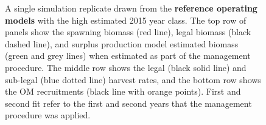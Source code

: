 \documentclass[11pt]{book}
\begin{document}
\newpage
\begin{landscape}
\begin{figure}[htb]

{\centering {} 

}

\caption{A single simulation replicate drawn from the \textbf{reference operating models} with the high estimated 2015 year class. The top row of panels show the spawning biomass (red line), legal biomass (black dashed line), and surplus production model estimated biomass (green and grey lines) when estimated as part of the management procedure. The middle row shows the legal (black solid line) and sub-legal (blue dotted line) harvest rates, and the bottom row shows the OM recruitments (black line with orange points). First and second fit refer to the first and second years that the management procedure was applied.}\label{fig:unnamed-chunk-22}
\end{figure}
\newpage
\begin{figure}[htb]

{\centering {} 

}
\end{figure}
\end{landscape}
\end{document}
